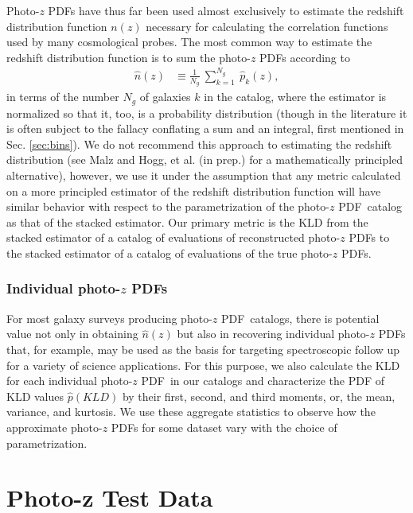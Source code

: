 \documentclass[\docopts]{\docclass}
\newcommand{\pz}{photo-$z$ PDF}
\newcommand{\Pz}{Photo-$z$ PDF}
\begin{document}
\Pz s have thus far been used almost exclusively to estimate the redshift 
distribution function $n(z)$ necessary for calculating the correlation 
functions used by many cosmological probes.  The most common way to estimate 
the redshift distribution function is to sum the \pz s according to
\begin{align}
  \label{eq:nz}
  \hat{n}(z) &\equiv \frac{1}{N_{g}}\ \sum_{k=1}^{N_{g}}\ \hat{p}_{k}(z),
\end{align}
in terms of the number $N_{g}$ of galaxies $k$ in the catalog, where the 
estimator is normalized so that it, too, is a probability distribution (though 
in the literature it is often subject to the fallacy conflating a sum and an 
integral, first mentioned in Sec. \ref{sec:bins}).  We do not recommend this 
approach to estimating the redshift distribution (see Malz and Hogg, et al. (in 
prep.) for a mathematically principled alternative), however, we use it under 
the assumption that any metric calculated on a more principled estimator of the 
redshift distribution function will have similar behavior with respect to the 
parametrization of the \pz\ catalog as that of the stacked estimator.  Our 
primary metric is the KLD from the stacked estimator of a catalog of 
evaluations of reconstructed \pz s to the stacked estimator of a catalog of 
evaluations of the true \pz s.

\subsubsection{Individual \pz s}
\label{sec:individual_metric}

For most galaxy surveys producing \pz\ catalogs, there is potential value not 
only in obtaining $\hat{n}(z)$ but also in recovering individual \pz s that, 
for example, may be used as the basis for targeting spectroscopic follow up for 
a variety of science applications.  For this purpose, we also calculate the KLD 
for each individual \pz\ in our catalogs and characterize the PDF of KLD values 
$\hat{p}(KLD)$ by their first, second, and third moments, or, the mean, 
variance, and kurtosis.  We use these aggregate statistics to observe how the 
approximate \pz s for some dataset vary with the choice of parametrization.





\section{Photo-z Test Data}
\label{sec:data}
\end{document}
